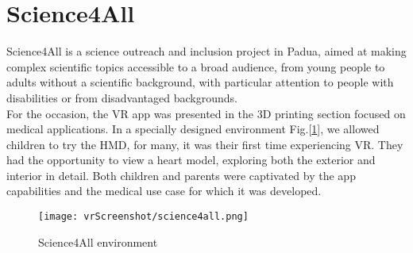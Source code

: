 \section{Science4All}
\noindent
Science4All is a science outreach and inclusion project in Padua, aimed at making complex scientific topics accessible to a broad audience,
from young people to adults without a scientific background, with particular attention to people with disabilities or from disadvantaged backgrounds.\\
For the occasion, the \ac{VR} app was presented in the 3D printing section focused on medical applications. In a specially designed environment Fig.[\ref{fig:science4all}], we allowed children to try the \ac{HMD}, for many, it was their first time experiencing VR. They had the opportunity to view a heart model, exploring both the exterior and interior in detail.
Both children and parents were captivated by the app capabilities and the medical use case for which it was developed.

\begin{figure}[ht]
  \centering
  \texttt{[image: vrScreenshot/science4all.png]}
  \caption{Science4All environment}
  \label{fig:science4all}
\end{figure}